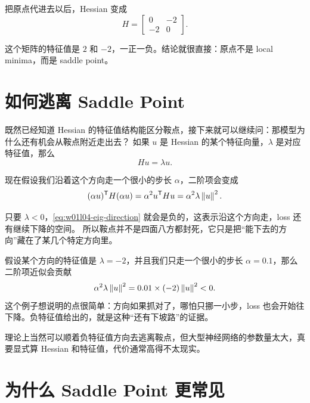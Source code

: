 \documentclass[main.tex]{subfiles}
\begin{document}
把原点代进去以后，Hessian 变成
\begin{equation}
  H =
  \begin{bmatrix}
    0 & -2 \\
    -2 & 0
  \end{bmatrix}.
  \label{eq:w01l04-hessian}
\end{equation}

这个矩阵的特征值是 $2$ 和 $-2$，一正一负。结论就很直接：原点不是 local minima，而是 saddle point。

\section{如何逃离 Saddle Point}
\label{sec:w01l04-escape}

既然已经知道 Hessian 的特征值结构能区分鞍点，接下来就可以继续问：那模型为什么还有机会从鞍点附近走出去？
如果 $u$ 是 Hessian 的某个特征向量，$\lambda$ 是对应特征值，那么
\begin{equation}
  Hu = \lambda u.
  \label{eq:w01l04-eig}
\end{equation}

现在假设我们沿着这个方向走一个很小的步长 $\alpha$，二阶项会变成
\begin{equation}
  (\alpha u)^{\mathsf{T}} H (\alpha u)
  = \alpha^2 u^{\mathsf{T}} H u
  = \alpha^2 \lambda \left\lVert u \right\rVert^2.
  \label{eq:w01l04-eig-direction}
\end{equation}

只要 $\lambda<0$，\cref{eq:w01l04-eig-direction} 就会是负的，这表示沿这个方向走，loss 还有继续下降的空间。
所以鞍点并不是四面八方都封死，它只是把“能下去的方向”藏在了某几个特定方向里。

\begin{examplebox}
假设某个方向的特征值是 $\lambda=-2$，并且我们只走一个很小的步长 $\alpha=0.1$，那么二阶项近似会贡献
\[
  \alpha^2 \lambda \left\lVert u \right\rVert^2 = 0.01 \times (-2)\left\lVert u \right\rVert^2 < 0.
\]
这个例子想说明的点很简单：方向如果抓对了，哪怕只挪一小步，loss 也会开始往下降。负特征值给出的，就是这种“还有下坡路”的证据。
\end{examplebox}

\begin{warningbox}
理论上当然可以顺着负特征值方向去逃离鞍点，但大型神经网络的参数量太大，真要显式算 Hessian 和特征值，代价通常高得不太现实。
\end{warningbox}

\section{为什么 Saddle Point 更常见}
\label{sec:w01l04-why-saddle}
\end{document}
